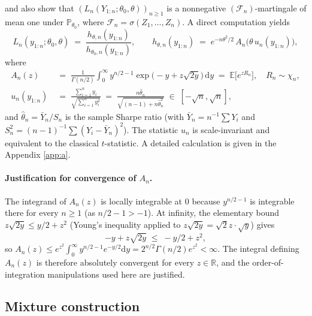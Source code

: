 \documentclass{article}%
\newcommand{\E}{\mathbb{E}}
\newcommand{\Prob}{\mathbb{P}}
\newcommand{\dd}{\,\mathrm{d}}
\newcommand{\diff}{\mathrm{d}}
\newcommand{\1}{\mathbf{1}}
\begin{document}
\cite{Wang2025} and also
\cite{PerezOrtiz2024} show that
\((L_n(Y_{1:n};\theta_0,\theta))_{n\geq 1}\) is a nonnegative
\((\mathcal F_n)\)-martingale of mean one under
\(\Prob_{\theta_0}\), where \(\mathcal F_n=\sigma(Z_1,\ldots,Z_n)\). A
direct computation \cite[Sec.~4.4]{Wang2025} yields
\begin{equation}\label{eq:hthetadef}
  L_n(y_{1:n};\theta_0,\theta)
  \;=\;\frac{h_{\theta,n}(y_{1:n})}{h_{\theta_0,n}(y_{1:n})},
  \qquad
  h_{\theta,n}(y_{1:n}) \;=\; e^{-n\theta^2/2}\,A_n\bigl(\theta\,u_n(y_{1:n})\bigr),
\end{equation}
where
\begin{align}
  A_n(z) &\;=\;\frac{1}{\Gamma(n/2)}\int_0^\infty y^{n/2-1}
                \exp\!\bigl(-y+z\sqrt{2y}\bigr)\dd y
              \;=\; \E\bigl[e^{z R_n}\bigr],\quad R_n\sim\chi_n,
              \label{eq:Andef}\\[2pt]
  u_n(y_{1:n})
       &\;=\;\frac{\sum_{i=1}^n y_i}{\sqrt{\sum_{i=1}^n y_i^2}}
       \;=\;\frac{n\widehat\theta_n}{\sqrt{(n-1)+n\widehat\theta_n^2}}
       \;\in\;[-\sqrt n,\sqrt n],
       \label{eq:undef}
\end{align}
and \(\widehat\theta_n=\bar Y_n/S_n\) is the sample Sharpe ratio
(with \(\bar Y_n=n^{-1}\sum Y_i\) and
\(S_n^2=(n-1)^{-1}\sum(Y_i-\bar Y_n)^2\)).
The statistic \(u_n\) is scale-invariant and equivalent to the
classical \(t\)-statistic. A detailed calculation is given in the Appendix \ref{app:a}.

\paragraph{Justification for convergence of $A_n$.} The integrand of $A_n(z)$ is locally integrable at $0$ because $y^{n/2-1}$ is integrable there for every $n\geq 1$ (as $n/2-1>-1$). At
infinity, the elementary bound $z\sqrt{2y}\leq y/2 + z^{2}$ (Young's inequality applied to $z\sqrt{2y}=\sqrt{2}z\cdot\sqrt{y}$) gives
\[
-y + z\sqrt{2y} \;\leq\; -y/2 + z^{2},
\]
so $A_n(z)\leq e^{z^{2}}\int_{0}^{\infty}y^{n/2-1}e^{-y/2}\diff y
= 2^{n/2}\Gamma(n/2)e^{z^{2}}<\infty$. The integral defining
$A_n(z)$ is therefore absolutely convergent for every $z\in\mathbb{R}$, and the order-of-integration manipulations used here are justified.


\subsection{Mixture construction}\label{ssec:mixture}
\end{document}
